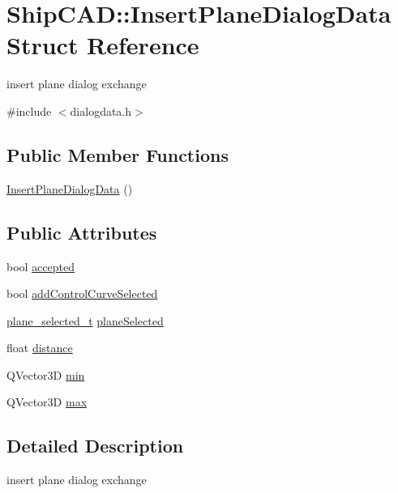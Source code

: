 \hypertarget{structShipCAD_1_1InsertPlaneDialogData}{}\section{Ship\+C\+AD\+:\+:Insert\+Plane\+Dialog\+Data Struct Reference}
\label{structShipCAD_1_1InsertPlaneDialogData}


insert plane dialog exchange  




{\ttfamily \#include $<$dialogdata.\+h$>$}

\subsection*{Public Member Functions}
\begin{DoxyCompactItemize}
\item 
\hyperlink{structShipCAD_1_1InsertPlaneDialogData_a413dd4a96e91adc9154a889cdad7c7fe}{Insert\+Plane\+Dialog\+Data} ()
\end{DoxyCompactItemize}
\subsection*{Public Attributes}
\begin{DoxyCompactItemize}
\item 
bool \hyperlink{structShipCAD_1_1InsertPlaneDialogData_a5b818074e9cca09e900e627fc9fc6e5c}{accepted}
\item 
bool \hyperlink{structShipCAD_1_1InsertPlaneDialogData_a930de438c156597564b6ae33dcea03c3}{add\+Control\+Curve\+Selected}
\item 
\hyperlink{namespaceShipCAD_aa0f3f220e102a298d2e698af90f5e1fc}{plane\+\_\+selected\+\_\+t} \hyperlink{structShipCAD_1_1InsertPlaneDialogData_aa028c61547384932261d4a8b647f9eeb}{plane\+Selected}
\item 
float \hyperlink{structShipCAD_1_1InsertPlaneDialogData_a73456e4622597dce48d16c05be358593}{distance}
\item 
Q\+Vector3D \hyperlink{structShipCAD_1_1InsertPlaneDialogData_a27431ce232112ee8c3c01cdc5eaba7fd}{min}
\item 
Q\+Vector3D \hyperlink{structShipCAD_1_1InsertPlaneDialogData_acef8dafcdd66649d8d0fa6fe6f8a7ea6}{max}
\end{DoxyCompactItemize}


\subsection{Detailed Description}
insert plane dialog exchange 

